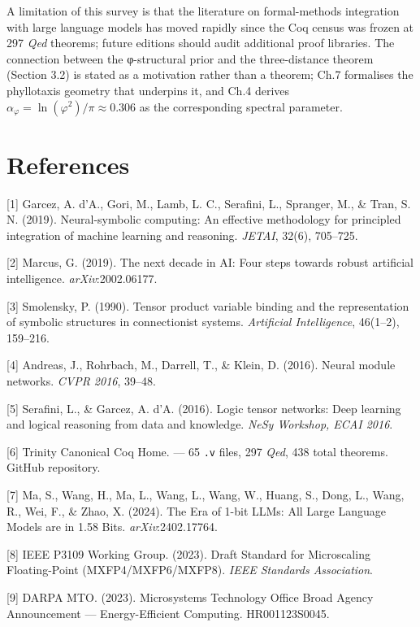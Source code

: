 A limitation of this survey is that the literature
on formal-methods integration with large language
models has moved rapidly since the Coq census was
frozen at 297 \emph{Qed} theorems; future editions
should audit additional proof libraries. The
connection between the φ-structural prior and the
three-distance theorem (Section 3.2) is stated as
a motivation rather than a theorem; Ch.7
formalises the phyllotaxis geometry that underpins
it, and Ch.4 derives
\(\alpha_\varphi = \ln(\varphi^2)/\pi \approx 0.306\)
as the corresponding spectral parameter.

\section{References}\label{fa_02:references}

[1] Garcez, A. d'A., Gori, M., Lamb, L. C.,
Serafini, L., Spranger, M., \& Tran, S. N. (2019).
Neural-symbolic computing: An effective
methodology for principled integration of machine
learning and reasoning. \emph{JETAI}, 32(6),
705--725.

[2] Marcus, G. (2019). The next decade in AI:
Four steps towards robust artificial intelligence.
\emph{arXiv}:2002.06177.

[3] Smolensky, P. (1990). Tensor product
variable binding and the representation of
symbolic structures in connectionist systems.
\emph{Artificial Intelligence}, 46(1--2),
159--216.

[4] Andreas, J., Rohrbach, M., Darrell, T., \&
Klein, D. (2016). Neural module networks.
\emph{CVPR 2016}, 39--48.

[5] Serafini, L., \& Garcez, A. d'A. (2016).
Logic tensor networks: Deep learning and logical
reasoning from data and knowledge. \emph{NeSy
Workshop, ECAI 2016}.

[6] Trinity Canonical Coq Home.
 --- 65
\texttt{.v} files, 297 \emph{Qed}, 438 total
theorems. GitHub repository.

[7] Ma, S., Wang, H., Ma, L., Wang, L., Wang,
W., Huang, S., Dong, L., Wang, R., Wei, F., \&
Zhao, X. (2024). The Era of 1-bit LLMs: All Large
Language Models are in 1.58 Bits.
\emph{arXiv}:2402.17764.

[8] IEEE P3109 Working Group. (2023). Draft
Standard for Microscaling Floating-Point
(MXFP4/MXFP6/MXFP8). \emph{IEEE Standards
Association}.

[9] DARPA MTO. (2023). Microsystems Technology
Office Broad Agency Announcement ---
Energy-Efficient Computing. HR001123S0045.

